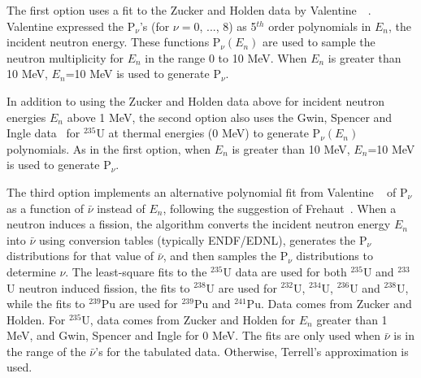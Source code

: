 \documentclass[11pt]{article}
\newcommand{\notgeant}[1]{}%
\begin{document}
The first option\notgeant{ ({\tt nudist=0})} uses a fit to the Zucker
and Holden data \cite{Zucker and Holden 1986} by
Valentine~\cite{Valentine 1996}~\cite{Valentine 2000}. Valentine
expressed the P$_{\nu}$'s (for $\nu=0$, ..., 8) as 5$^{th}$ order
polynomials in $E_n$, the incident neutron energy. These functions 
P$_{\nu}(E_n)$ are used to sample the neutron multiplicity for 
$E_n$ in the range 0 to 10 MeV.  When $E_n$ is greater than 10 MeV, 
$E_n$=10 MeV is used to generate P$_{\nu}$.

In addition to using the Zucker and Holden data above for incident
neutron energies $E_n$ above 1 MeV, the second
option\notgeant{ ({\tt nudist=1})} also uses the Gwin, Spencer and
Ingle data~\cite{Gwin 1984} for $^{235}$U at thermal energies (0 MeV) 
to generate P$_{\nu}(E_n)$ polynomials. As in the first option, when
$E_n$ is greater than 10 MeV, $E_n$=10 MeV is used to generate
P$_{\nu}$.

The third option\notgeant{ ({\tt nudist=2})} implements an alternative
polynomial fit from Valentine ~\cite{Valentine 2000} of  P$_{\nu}$
as a function of $\bar{\nu}$ instead of $E_n$, following the suggestion 
of Frehaut~\cite{Frehaut 1988}.
%
%
When a neutron induces a fission, the algorithm converts the incident
neutron energy $E_n$ into $\bar{\nu}$ using conversion tables
(typically ENDF/EDNL), generates the P$_{\nu}$ distributions for that
value of $\bar{\nu}$, and then samples the P$_{\nu}$ distributions to
determine $\nu$. The least-square fits to the $^{235}$U data are used
for both $^{235}$U and $^{233}$U neutron induced fission, the fits to
$^{238}$U are used for $^{232}$U, $^{234}$U, $^{236}$U and $^{238}$U, while the
fits to $^{239}$Pu are used for $^{239}$Pu and $^{241}$Pu. Data comes from
Zucker and Holden. For $^{235}$U, data comes from Zucker and Holden 
for $E_n$ greater than 1 MeV, and Gwin, Spencer and
Ingle for 0 MeV. The fits are only used when $\bar{\nu}$ is in the 
range of the $\bar{\nu}$'s for the tabulated data. Otherwise, 
Terrell's approximation is used.
\end{document}
